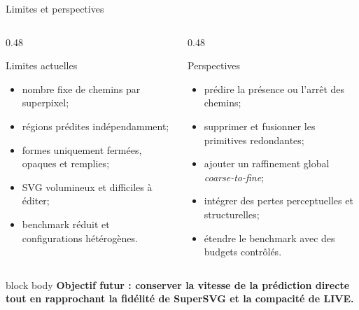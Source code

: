 \documentclass[11pt,aspectratio=169]{beamer}
\newcommand{\takeaway}[1]{%
  \begin{beamercolorbox}[wd=\linewidth,sep=0.55em,rounded=true]{block body}
    \centering\bfseries\color{DeepTeal}#1
  \end{beamercolorbox}%
}
\begin{document}
\begin{frame}{Limites et perspectives}
  \begin{columns}[T,onlytextwidth]
    \begin{column}{0.48\textwidth}
      \begin{alertblock}{Limites actuelles}
        \begin{itemize}
          \item nombre fixe de chemins par superpixel;
          \item régions prédites indépendamment;
          \item formes uniquement fermées, opaques et remplies;
          \item SVG volumineux et difficiles à éditer;
          \item benchmark réduit et configurations hétérogènes.
        \end{itemize}
      \end{alertblock}
    \end{column}
    \begin{column}{0.48\textwidth}
      \begin{block}{Perspectives}
        \begin{itemize}
          \item prédire la présence ou l'arrêt des chemins;
          \item supprimer et fusionner les primitives redondantes;
          \item ajouter un raffinement global \textit{coarse-to-fine};
          \item intégrer des pertes perceptuelles et structurelles;
          \item étendre le benchmark avec des budgets contrôlés.
        \end{itemize}
      \end{block}
    \end{column}
  \end{columns}

  \vfill
  \takeaway{Objectif futur : conserver la vitesse de la prédiction directe tout en rapprochant la fidélité de SuperSVG et la compacité de LIVE.}
\end{frame}
\end{document}

